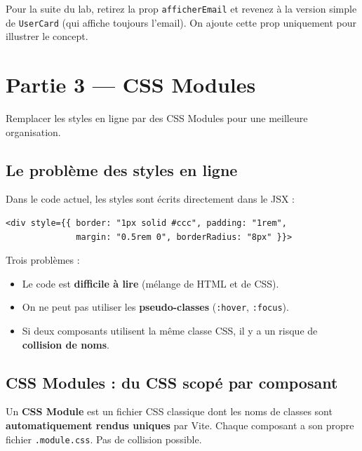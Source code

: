\documentclass[11pt,a4paper]{article}
\begin{document}
Pour la suite du lab, retirez la prop \texttt{afficherEmail} et revenez à la version simple de \texttt{UserCard} (qui affiche toujours l'email). On ajoute cette prop uniquement pour illustrer le concept.

\section{Partie 3 --- CSS Modules}
\label{sec:css-modules}

\begin{objectifbox}
Remplacer les styles en ligne par des CSS Modules pour une meilleure organisation.
\end{objectifbox}

\subsection{Le problème des styles en ligne}

Dans le code actuel, les styles sont écrits directement dans le JSX :

\begin{lstlisting}
<div style={{ border: "1px solid #ccc", padding: "1rem",
              margin: "0.5rem 0", borderRadius: "8px" }}>
\end{lstlisting}

Trois problèmes :
\begin{itemize}[nosep]
    \item Le code est \textbf{difficile à lire} (mélange de HTML et de CSS).
    \item On ne peut pas utiliser les \textbf{pseudo-classes} (\texttt{:hover}, \texttt{:focus}).
    \item Si deux composants utilisent la même classe CSS, il y a un risque de \textbf{collision de noms}.
\end{itemize}

\subsection{CSS Modules : du CSS scopé par composant}

Un \textbf{CSS Module} est un fichier CSS classique dont les noms de classes sont \textbf{automatiquement rendus uniques} par Vite. Chaque composant a son propre fichier \texttt{.module.css}. Pas de collision possible.
\end{document}

